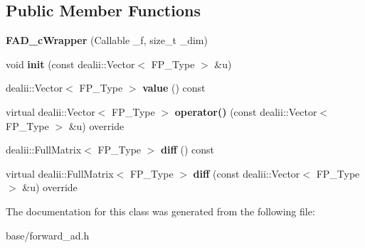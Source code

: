 \subsection*{Public Member Functions}
\begin{DoxyCompactItemize}
\item 
\mbox{\label{classFAD__cWrapper_a4f9073b7ba4faa9624d2950960d9400d}} 
{\bfseries F\+A\+D\+\_\+c\+Wrapper} (Callable \+\_\+f, size\+\_\+t \+\_\+dim)
\item 
\mbox{\label{classFAD__cWrapper_a63579e11de4e55de607a84619ced86e2}} 
void {\bfseries init} (const dealii\+::\+Vector$<$ F\+P\+\_\+\+Type $>$ \&u)
\item 
\mbox{\label{classFAD__cWrapper_a3f09fcd9fdb951eae4605cc3f57552cf}} 
dealii\+::\+Vector$<$ F\+P\+\_\+\+Type $>$ {\bfseries value} () const
\item 
\mbox{\label{classFAD__cWrapper_a6b167bc4c72bfea7c8690e61c9099652}} 
virtual dealii\+::\+Vector$<$ F\+P\+\_\+\+Type $>$ {\bfseries operator()} (const dealii\+::\+Vector$<$ F\+P\+\_\+\+Type $>$ \&u) override
\item 
\mbox{\label{classFAD__cWrapper_a21ebd0df0ef04881cc2c8f6a45df9a67}} 
dealii\+::\+Full\+Matrix$<$ F\+P\+\_\+\+Type $>$ {\bfseries diff} () const
\item 
\mbox{\label{classFAD__cWrapper_add022de660756689b756924d5319c9ba}} 
virtual dealii\+::\+Full\+Matrix$<$ F\+P\+\_\+\+Type $>$ {\bfseries diff} (const dealii\+::\+Vector$<$ F\+P\+\_\+\+Type $>$ \&u) override
\end{DoxyCompactItemize}


The documentation for this class was generated from the following file\+:\begin{DoxyCompactItemize}
\item 
base/forward\+\_\+ad.\+h\end{DoxyCompactItemize}
